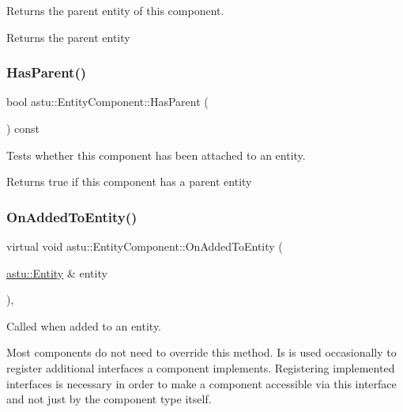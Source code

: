 Returns the parent entity of this component.

\begin{DoxyReturn}{Returns}
the parent entity 
\end{DoxyReturn}
\mbox{\label{classastu_1_1EntityComponent_a84f03e175444f5ca650775fb89963925}} 
\subsubsection{\texorpdfstring{Has\+Parent()}{HasParent()}}
{\footnotesize\ttfamily bool astu\+::\+Entity\+Component\+::\+Has\+Parent (\begin{DoxyParamCaption}{ }\end{DoxyParamCaption}) const\hspace{0.3cm}{\ttfamily [inline]}}

Tests whether this component has been attached to an entity.

\begin{DoxyReturn}{Returns}
{\ttfamily true} if this component has a parent entity 
\end{DoxyReturn}
\mbox{\label{classastu_1_1EntityComponent_a8736f12dc9d2be7d2569408fc1040480}} 
\subsubsection{\texorpdfstring{On\+Added\+To\+Entity()}{OnAddedToEntity()}}
{\footnotesize\ttfamily virtual void astu\+::\+Entity\+Component\+::\+On\+Added\+To\+Entity (\begin{DoxyParamCaption}\item[{\hyperlink{classastu_1_1Entity}{astu\+::\+Entity} \&}]{entity }\end{DoxyParamCaption})\hspace{0.3cm}{\ttfamily [inline]}, {\ttfamily [virtual]}}

Called when added to an entity.

Most components do not need to override this method. Is is used occasionally to register additional interfaces a component implements. Registering implemented interfaces is necessary in order to make a component accessible via this interface and not just by the component type itself.


